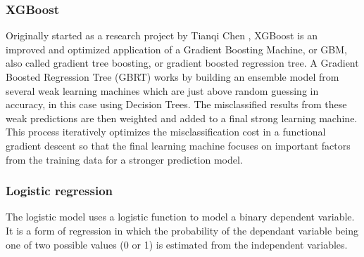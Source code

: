 \documentclass[review]{elsarticle}
\begin{document}




\subsubsection{XGBoost}
\label{xgboost}

Originally started as a research project by Tianqi Chen \cite[][]{xgboost}, XGBoost is an improved and optimized application of a Gradient Boosting Machine, or GBM, also called gradient tree boosting, or gradient boosted regression tree. A Gradient Boosted Regression Tree (GBRT) works by building an ensemble model from several weak learning machines which are just above random guessing in accuracy, in this case using Decision Trees. The misclassified results from these weak predictions are then weighted and added to a final strong learning machine. This process iteratively optimizes the misclassification cost in a functional gradient descent so that the final learning machine focuses on important factors from the training data for a stronger prediction model. 


\subsubsection{Logistic regression}
\label{logit_regression}

The logistic model \cite[][]{logit} uses a logistic function to model a binary dependent variable. It is a form of regression in which the probability of the dependant variable being one of two possible values (0 or 1) is estimated from the independent variables. 
\end{document}
